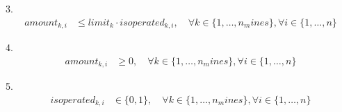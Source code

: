 \documentclass{article}
\begin{document}
3.  
\begin{align*}
amount_{k,i} &\leq limit_k \cdot isoperated_{k,i}, \quad \forall k \in \{1, \dots, n_mines\}, \forall i \in \{1,\dots,n\}
\end{align*}

4. 
\begin{align*}
amount_{k,i} &\geq 0, \quad \forall k \in \{1,\dots,n_mines\}, \forall i \in \{1,\dots,n\}
\end{align*}

5. 
\begin{align*}
isoperated_{k,i} &\in \{0, 1\}, \quad \forall k \in \{1,\dots,n_mines\}, \forall i \in \{1,\dots,n\}
\end{align*}
\end{document}

